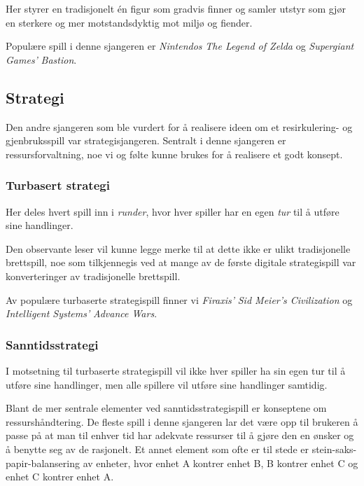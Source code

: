 	Her styrer en tradisjonelt én figur som gradvis finner og samler utstyr som gjør en sterkere og mer motstandsdyktig mot miljø og fiender.


	Populære spill i denne sjangeren er \emph{Nintendos} \emph{The Legend of Zelda} og \emph{Supergiant Games'} \emph{Bastion}.





\subsection{Strategi}\label{sec:strategispill}
Den andre sjangeren som ble vurdert for å realisere ideen om et resirkulering- og gjenbruksspill var strategisjangeren. Sentralt i denne sjangeren er ressursforvaltning, noe vi og følte kunne brukes for å realisere et godt konsept.

	\subsubsection{Turbasert strategi}

	Her deles hvert spill inn i \emph{runder}, hvor hver spiller har en egen \emph{tur} til å utføre sine handlinger.


	Den observante leser vil kunne legge merke til at dette ikke er ulikt tradisjonelle brettspill, noe som tilkjennegis ved at mange av de første digitale strategispill var konverteringer av tradisjonelle brettspill.

	Av populære turbaserte strategispill finner vi \emph{Firaxis'} \emph{Sid Meier's Civilization} og \emph{Intelligent Systems'} \emph{Advance Wars}. %



	\subsubsection{Sanntidsstrategi}

	I motsetning til turbaserte strategispill vil ikke hver spiller ha sin egen tur til å utføre sine handlinger, men alle spillere vil utføre sine handlinger samtidig.

	Blant de mer sentrale elementer ved sanntidsstrategispill er konseptene om ressurshåndtering. De fleste spill i denne sjangeren lar det være opp til brukeren å passe på at man til enhver tid har adekvate ressurser til å gjøre den en ønsker og å benytte seg av de rasjonelt. Et annet element som ofte er til stede er stein-saks-papir-balansering av enheter, hvor enhet A kontrer enhet B, B kontrer enhet C og enhet C kontrer enhet A.

